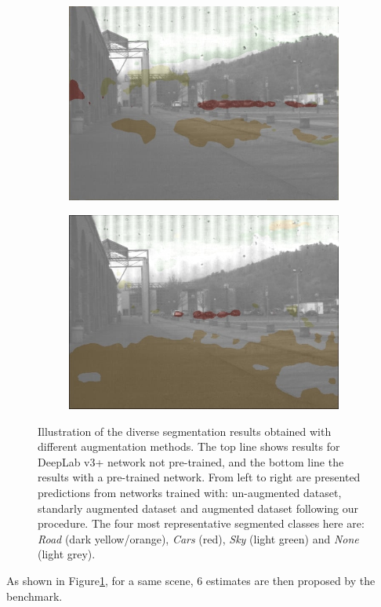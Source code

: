 \begin{figure}[h]
\begin{subfigure}[b]{0.3\linewidth}
		\includegraphics[width=\linewidth]{Figures/Aug/BA2/selected_images/overlayed/over0.jpg}
	\end{subfigure}
	\begin{subfigure}[b]{0.3\linewidth}  
		\centering 
		\includegraphics[width=\linewidth]{Figures/Aug/CA2/selected_images/overlayed/over0.jpg}
	\end{subfigure}
	\caption[Illustration of the diverse segmentation results obtained with different augmentation methods.]{Illustration of the diverse segmentation results obtained with different augmentation methods. The top line shows results for DeepLab v3+ network not pre-trained, and the bottom line the results with a pre-trained network. From left to right are presented predictions from networks trained with: un-augmented dataset, standarly augmented dataset and augmented dataset following our procedure. The four most representative segmented classes here are: \textit{Road} (\textcolor{road}{dark yellow/orange}), \textit{Cars} (\textcolor{car}{red}), \textit{Sky} (\textcolor{sky}{light green}) and \textit{None} (\textcolor{none}{light grey}). %
	}
	\label{comp1}
	\vspace{-0.25cm}
\end{figure}
As shown in Figure\ref{comp1}, for a same scene, 6 estimates are then proposed by the benchmark.



